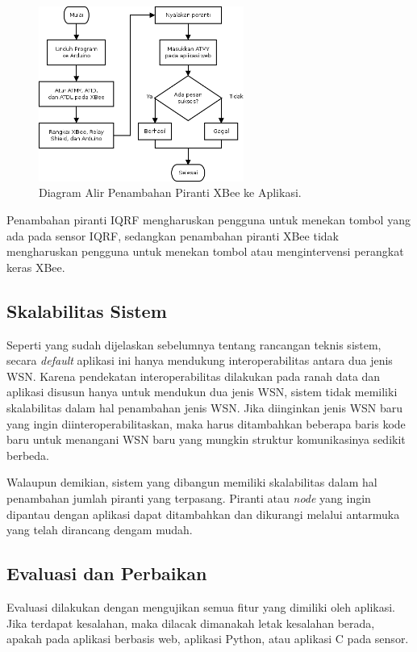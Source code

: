 			\begin{figure}[H]
			  \centering
			    \includegraphics[width=0.6\textwidth]{gambar/add-xbee}
			    \caption{Diagram Alir Penambahan Piranti XBee ke Aplikasi.}
			    \label{add-xbee}
			\end{figure}

			Penambahan piranti IQRF mengharuskan pengguna untuk menekan tombol yang ada pada sensor IQRF, sedangkan penambahan piranti XBee tidak mengharuskan pengguna untuk menekan tombol atau mengintervensi perangkat keras XBee.

		\subsection{Skalabilitas Sistem}
			Seperti yang sudah dijelaskan sebelumnya tentang rancangan teknis sistem, secara \emph{default} aplikasi ini hanya mendukung interoperabilitas antara dua jenis WSN. Karena pendekatan interoperabilitas dilakukan pada ranah data dan aplikasi disusun hanya untuk mendukun dua jenis WSN, sistem tidak memiliki skalabilitas dalam hal penambahan jenis WSN. Jika diinginkan jenis WSN baru yang ingin diinteroperabilitaskan, maka harus ditambahkan beberapa baris kode baru untuk menangani WSN baru yang mungkin struktur komunikasinya sedikit berbeda.

			Walaupun demikian, sistem yang dibangun memiliki skalabilitas dalam hal penambahan jumlah piranti yang terpasang. Piranti atau \emph{node} yang ingin dipantau dengan aplikasi dapat ditambahkan dan dikurangi melalui antarmuka yang telah dirancang dengam mudah.


		\subsection{Evaluasi dan Perbaikan}
			Evaluasi dilakukan dengan mengujikan semua fitur yang dimiliki oleh aplikasi. Jika terdapat kesalahan, maka dilacak dimanakah letak kesalahan berada, apakah pada aplikasi berbasis web, aplikasi Python, atau aplikasi C pada sensor.

